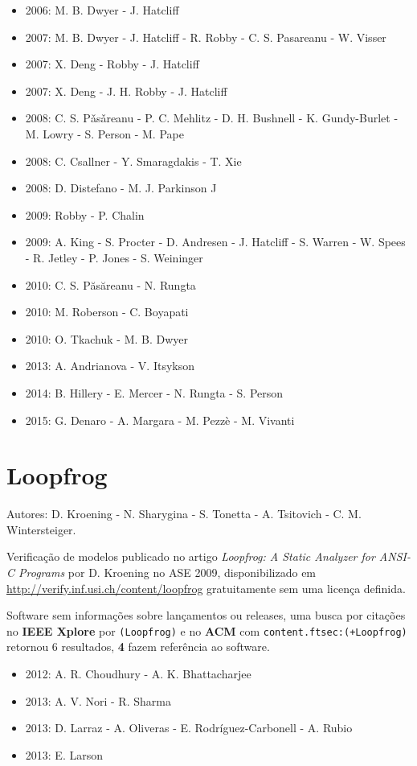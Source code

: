 \begin{itemize}
\item 2006: M. B. Dwyer - J. Hatcliff
\item 2007: M. B. Dwyer - J. Hatcliff - R. Robby - C. S. Pasareanu - W. Visser
\item 2007: X. Deng - Robby - J. Hatcliff
\item 2007: X. Deng - J. H. Robby - J. Hatcliff
\item 2008: C. S. P\v{a}s\v{a}reanu - P. C. Mehlitz - D. H. Bushnell - K. Gundy-Burlet - M. Lowry - S. Person - M. Pape
\item 2008: C. Csallner - Y. Smaragdakis - T. Xie
\item 2008: D. Distefano - M. J. Parkinson J
\item 2009: Robby - P. Chalin
\item 2009: A. King - S. Procter - D. Andresen - J. Hatcliff - S. Warren - W. Spees - R. Jetley - P. Jones - S. Weininger
\item 2010: C. S. P\u{a}s\u{a}reanu - N. Rungta
\item 2010: M. Roberson - C. Boyapati
\item 2010: O. Tkachuk - M. B. Dwyer
\item 2013: A. Andrianova - V. Itsykson
\item 2014: B. Hillery - E. Mercer - N. Rungta - S. Person
\item 2015: G. Denaro - A. Margara - M. Pezz\`{e} - M. Vivanti
\end{itemize}

\section{Loopfrog}

Autores:
D. Kroening - N. Sharygina - S. Tonetta - A. Tsitovich - C. M. Wintersteiger.

Verificação de modelos
publicado no artigo {\it Loopfrog: A Static Analyzer for ANSI-C Programs}
por D. Kroening
no ASE 2009,
disponibilizado em \url{http://verify.inf.usi.ch/content/loopfrog}
gratuitamente
sem uma licença definida.

Software sem informações sobre lançamentos ou releases,
uma busca por citações no {\bf IEEE Xplore} por
\texttt{(Loopfrog)}
e no {\bf ACM} com
\texttt{content.ftsec:(+Loopfrog)}
retornou
6 resultados,
{\bf 4} fazem referência ao software.

\begin{itemize}
\item 2012: A. R. Choudhury - A. K. Bhattacharjee
\item 2013: A. V. Nori - R. Sharma
\item 2013: D. Larraz - A. Oliveras - E. Rodríguez-Carbonell - A. Rubio
\item 2013: E. Larson
\end{itemize}

